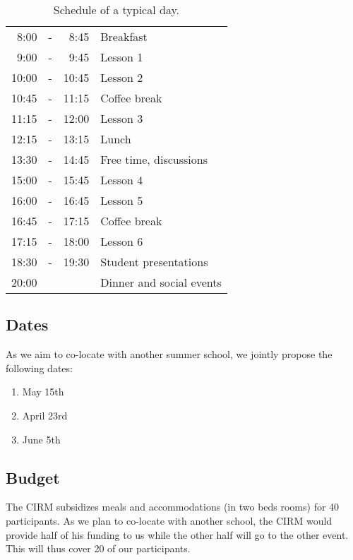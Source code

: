 \documentclass[a4paper]{scrartcl}
\begin{document}
\begin{table}[ht]
	\centering
	\begin{tabular}{rcrl}
	 8:00 & - &  8:45 & Breakfast \\
	 9:00 & - &  9:45 & Lesson 1 \\
	10:00 & - & 10:45 & Lesson 2 \\
	10:45 & - & 11:15 & Coffee break \\
	11:15 & - & 12:00 & Lesson 3 \\
	12:15 & - & 13:15 & Lunch \\
	13:30 & - & 14:45 & Free time, discussions \\
	15:00 & - & 15:45 & Lesson 4 \\
	16:00 & - & 16:45 & Lesson 5 \\
	16:45 & - & 17:15 & Coffee break \\
	17:15 & - & 18:00 & Lesson 6 \\
	18:30 & - & 19:30 & Student presentations \\
	20:00 &   &       & Dinner and social events
	\end{tabular}
	\caption{Schedule of a typical day.}
	\label{schedule}
\end{table}

\subsection{Dates}

As we aim to co-locate with another summer school, we jointly propose the
following dates:
\begin{enumerate}
	\setlength{\itemsep}{0pt} \setlength{\parskip}{0pt}
	\item May 15th
	\item April 23rd
	\item June 5th
\end{enumerate}

\subsection{Budget}

The CIRM subsidizes meals and accommodations (in two beds rooms) for 40
participants. As we plan to co-locate with another school, the CIRM would
provide half of his funding to us while the other half will go to the other
event. This will thus cover 20 of our participants.
\end{document}
